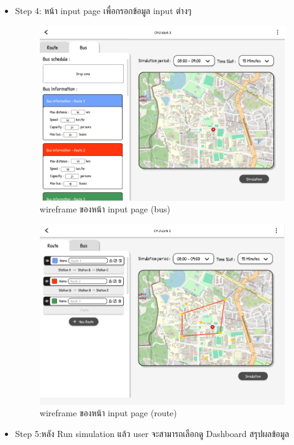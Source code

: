 \begin{mypara}
\begin{itemize}
\begin{itemize}
    \end{itemize}
    \item Step 4: หน้า input page เพื่อกรอกข้อมูล input ต่างๆ
    \begin{figure}[H]
    \centering 
    \includegraphics[scale=0.4]{input_bus.png}
    \caption{wireframe ของหน้า input page (bus) }
    \label{fig:WireframeInputLogin}
    \end{figure}
    \begin{figure}[H]
    \centering
    \includegraphics[scale=0.4]{input_route.png}
    \caption{wireframe ของหน้า input page (route) }
    \label{fig:WireframeInputRouteLogin}
    \end{figure}
    \item Step 5:หลัง Run simulation แล้ว user จะสามารถเลือกดู  Dashboard สรุปผลข้อมูล

\end{itemize}
\end{mypara}
